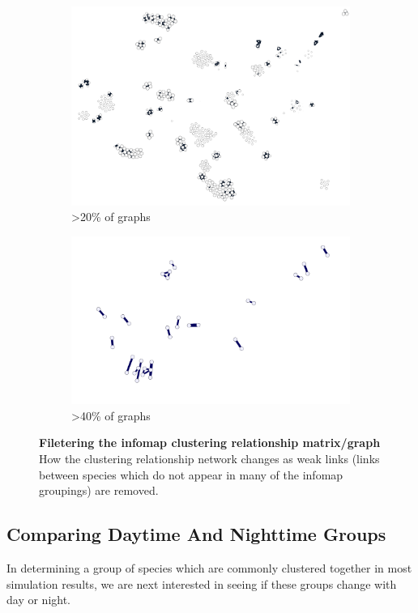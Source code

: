 \begin{figure}[H]
\begin{subfigure}[t]{.5\textwidth}
  \centering
  \includegraphics[width=\textwidth]{fig/c3.png}
  \caption{>20\% of graphs}
\end{subfigure}%
\begin{subfigure}[t]{.5\textwidth}
  \centering
  \includegraphics[width=\textwidth]{fig/c4.png}
  \caption{>40\% of graphs}
\end{subfigure}%
\caption{\textbf{Filetering the infomap clustering relationship matrix/graph} How the clustering relationship network changes as weak links (links between species which do not appear in many of the infomap groupings) are removed. }
\label{fig:infomapprune}
\end{figure}

\subsection{Comparing Daytime And Nighttime Groups}
In determining a group of species which are commonly clustered together in most simulation results, we are next interested in seeing if these groups change with day or night.

